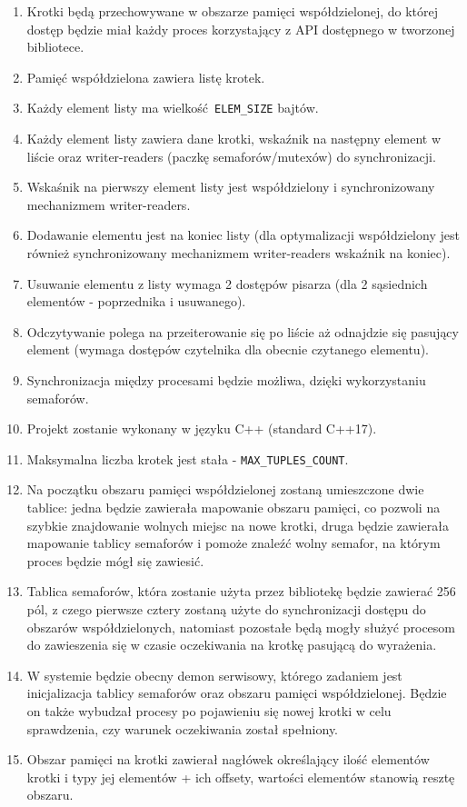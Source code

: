 \documentclass{article}
\begin{document}
	\begin{enumerate}
		\item Krotki będą przechowywane w obszarze pamięci współdzielonej, do której dostęp będzie miał każdy proces korzystający z API dostępnego w tworzonej bibliotece.
        \item Pamięć współdzielona zawiera listę krotek.
        \item Każdy element listy ma wielkość \texttt{ELEM\_SIZE} bajtów.
        \item Każdy element listy zawiera dane krotki, wskaźnik na następny element w liście oraz writer-readers (paczkę semaforów/mutexów) do synchronizacji.
        \item Wskaśnik na pierwszy element listy jest współdzielony i synchronizowany mechanizmem writer-readers.
        \item Dodawanie elementu jest na koniec listy (dla optymalizacji współdzielony jest również synchronizowany mechanizmem writer-readers wskaźnik na koniec).
        \item Usuwanie elementu z listy wymaga 2 dostępów pisarza (dla 2 sąsiednich elementów - poprzednika i usuwanego).
        \item Odczytywanie polega na przeiterowanie się po liście aż odnajdzie się pasujący element (wymaga dostępów czytelnika dla obecnie czytanego elementu).
		\item Synchronizacja między procesami będzie możliwa, dzięki wykorzystaniu semaforów.
		\item Projekt zostanie wykonany w języku C++ (standard C++17).
        \item Maksymalna liczba krotek jest stała - \texttt{MAX\_TUPLES\_COUNT}.
		\item Na początku obszaru pamięci współdzielonej zostaną umieszczone dwie tablice: jedna będzie zawierała mapowanie obszaru pamięci, co pozwoli na szybkie znajdowanie wolnych miejsc na nowe krotki, druga będzie zawierała mapowanie tablicy semaforów i pomoże znaleźć wolny semafor, na którym proces będzie mógł się zawiesić.
		\item Tablica semaforów, która zostanie użyta przez bibliotekę będzie zawierać 256 pól, z czego pierwsze cztery zostaną użyte do synchronizacji dostępu do obszarów współdzielonych, natomiast pozostałe będą mogły służyć procesom do zawieszenia się w czasie oczekiwania na krotkę pasującą do wyrażenia.
		\item W systemie będzie obecny demon serwisowy, którego zadaniem jest inicjalizacja tablicy semaforów oraz obszaru pamięci współdzielonej. Będzie on także wybudzał procesy po pojawieniu się nowej krotki w celu sprawdzenia, czy warunek oczekiwania został spełniony.
		\item Obszar pamięci na krotki zawierał nagłówek określający ilość elementów krotki i typy jej elementów + ich offsety, wartości elementów stanowią resztę obszaru.
	\end{enumerate}
\end{document}
